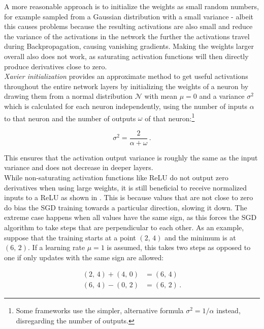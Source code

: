 A more reasonable approach is to initialize the weights as small random numbers, for example sampled from a Gaussian distribution with a small variance - albeit this causes problems because the resulting activations are also small and reduce the variance of the activations in the network the further the activations travel during Backpropagation, causing vanishing gradients. Making the weights larger overall also does not work, as saturating activation functions will then directly produce derivatives close to zero. \cite{karpathy_lecture2}\\

\noindent \textit{Xavier initialization} \cite{glorot} provides an approximate method to get useful activations throughout the entire network layers by initializing the weights of a neuron by drawing them from a normal distribution $\mathcal{N}$ with mean $\mu = 0$ and a variance $\sigma^2$ which is calculated for each neuron independently, using the number of inputs $\alpha$ to that neuron and the number of outputs $\omega$ of that neuron:\footnote{Some frameworks use the simpler, alternative formula $\sigma^2 = 1/\alpha$ instead, disregarding the number of outputs.}

\[ \sigma^2 = \frac{2}{\alpha + \omega} \,. \]

\noindent This ensures that the activation output variance is roughly the same as the input variance and does not decrease in deeper layers.\\ %

\noindent While non-saturating activation functions like ReLU do not output zero derivatives when using large weights, it is still beneficial to receive normalized inputs to a ReLU as shown in \cite{lecun_norm}. This is because values that are not close to zero do bias the SGD training towards a particular direction, slowing it down. The extreme case happens when all values have the same sign, as this forces the SGD algorithm to take steps that are perpendicular to each other. As an example, suppose that the training starts at a point $(2,\, 4)$ and the minimum is at $(6,\, 2)$. If a learning rate $\mu = 1$ is assumed, this takes two steps as opposed to one if only updates with the same sign are allowed:

\begin {align}
	(2,\, 4) + (4,\, 0) &= (6,\, 4)\\
	(6,\, 4) - (0,\, 2) &= (6,\, 2) \,.
\end {align}

